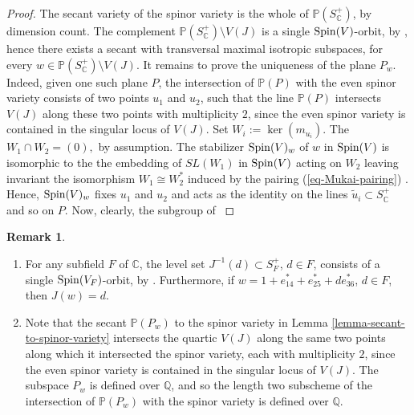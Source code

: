 \documentclass[12pt]{amsart}
\numberwithin{equation}{subsection}
\theoremstyle{plain}
\theoremstyle{definition}
\newtheorem{rem}[thm]{Remark}
\newcommand{\CC}{{\mathbb C}}
\newcommand{\QQ}{{\mathbb Q}}
\newcommand{\PP}{{\mathbb P}}
\newcommand{\Spin}{{\rm Spin}}
\begin{document}
\begin{proof}
{The secant variety of the spinor variety is the whole of
$\PP(S^+_\CC)$, by dimension count. 
The complement $\PP(S^+_\CC)\setminus V(J)$ is a single $\Spin(V)$-orbit, by \cite[Prop. 3]{igusa}, hence there exists a secant with transversal maximal isotropic subspaces, for every $w\in \PP(S^+_\CC)\setminus V(J)$.
It remains to prove the uniqueness of the plane $P_w$.
Indeed, given one 
such plane $P$, the intersection of $\PP(P)$ with the even spinor variety consists of two points $u_1$ and $u_2$, such that 
the line $\PP(P)$ intersects $V(J)$ along these two points with multiplicity $2$, since the even spinor variety is contained in the singular locus of $V(J)$. Set $W_i:=\ker(m_{u_i})$. The $W_1\cap W_2=(0),$ by assumption.
The stabilizer $\Spin(V)_w$ of $w$ in $\Spin(V)$ is 
isomorphic to the the embedding of $SL(W_1)$ in $\Spin(V)$ 
acting on $W_2$ leaving invariant the isomorphism $W_1\cong W_2^*$ induced  by the pairing (\ref{eq-Mukai-pairing}) \cite[Prop. 3]{igusa}. Hence, $\Spin(V)_w$ fixes $u_1$ and $u_2$ and acts as the identity on the lines $\tilde{u}_i\subset S^+_\CC$ and so on $P$. Now, clearly, the subgroup of 
}
\end{proof}




\begin{rem}
\begin{enumerate}
\item
For any subfield $F$ of $\CC$, 
the level set $J^{-1}(d)\subset S^+_F$, $d\in F$, consists of a single $\Spin(V_F)$-orbit, by \cite[Prop. 3]{igusa}. 
Furthermore, if $w=1+e_{14}^*+e_{25}^*+de_{36}^*$, $d\in F$, then $J(w)=d$.
\item
Note that the secant $\PP(P_w)$ to the spinor variety in Lemma \ref{lemma-secant-to-spinor-variety} intersects the quartic $V(J)$ along the same two points along which it intersected the spinor variety, each with multiplicity $2$, since the even spinor variety is contained in the singular locus of $V(J)$. The subspace $P_w$ is defined over $\QQ$, and so the length two subscheme of the intersection of $\PP(P_w)$ with the spinor variety is defined over $\QQ$. 
\end{enumerate}
\end{rem}
\end{document}
